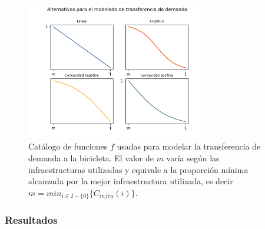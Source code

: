 \documentclass{article}
\begin{document}
  \begin{figure}[h!]
    \centering
    \includegraphics[width=8cm]{../resources/f_catalog.png}
      \caption{Catálogo de funciones $f$ usadas para modelar la transferencia de demanda a la bicicleta. El valor de $m$ varía según las infraestructuras utilizadas y equivale a la proporción mínima alcanzada por la mejor infraestructura utilizada, es decir $m = min_{i \in I - \{0\}} \{ C_{infra}(i) \}$.}
    \label{fig:fcatalog}
  \end{figure}

  \FloatBarrier
  \subsubsection{Resultados}
\end{document}
